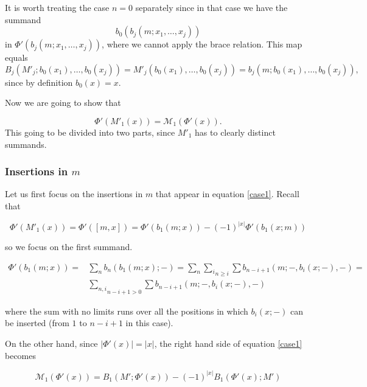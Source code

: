 \documentclass[twoside]{article}
\begin{document}
It is worth treating the case $n=0$ separately since in that case we have the summand \[b_0(b_j(m;x_1,\dots, x_j))\] 
in $\Phi'(b_j(m;x_1,\dots, x_j))$, where we cannot apply the brace relation. This map equals \[B_j(M'_j;b_0(x_1),\dots, b_0(x_j))=M'_j(b_0(x_1),\dots, b_0(x_j))=b_j(m;b_0(x_1),\dots, b_0(x_j)),\] since by definition $b_0(x)=x$.%

Now we are going to show that 

\begin{equation}\label{case1}
\Phi'(M'_1(x))=\mathcal{M}_1(\Phi'(x)).
\end{equation} This going to be divided into two parts, since $M'_1$ has to clearly distinct summands.

\subsubsection{Insertions in $m$}

Let us first focus on the insertions in $m$ that appear in equation \ref{case1}. Recall that 

\begin{equation}\label{phim}
\Phi'(M'_1(x))=\Phi'([m,x])=\Phi'(b_1(m;x))-(-1)^{|x|}\Phi'(b_1(x;m))
\end{equation}

so we focus on the first summand. 

\begin{align*}
\Phi'(b_1(m;x))=&\sum_n b_n(b_1(m;x);-)=\sum_n \underset{n\geq i}{\sum_i} \sum b_{n-i+1}(m;-, b_i(x;-),-)=\\
&\underset{n-i+1> 0}{\sum_{n,i}}\sum b_{n-i+1}(m;-, b_i(x;-),-)
\end{align*}

where the sum with no limits runs over all the positions in which $b_i(x;-)$ can be inserted (from $1$ to $n-i+1$ in this case). 


On the other hand, since $|\Phi'(x)|=|x|$, the right hand side of equation \ref{case1} becomes

\begin{equation}\label{mphi}
\mathcal{M}_1(\Phi'(x))=B_1(M';\Phi'(x))-(-1)^{|x|}B_1(\Phi'(x);M')
\end{equation}
\end{document}
